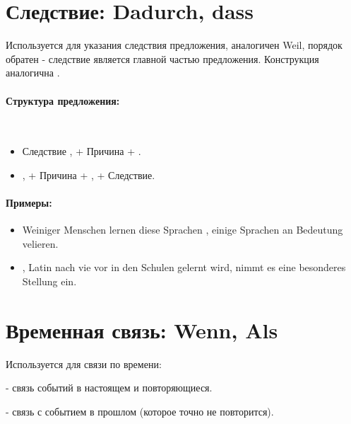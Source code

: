 \section{Следствие: Dadurch, dass}

Используется для указания следствия предложения, аналогичен Weil, порядок обратен - следствие является главной частью предложения. Конструкция аналогична .

\paragraph{Структура предложения:} ~\\
\begin{itemize}
    \item Следствие ,  + Причина + \dverb{}.
    \item {},  + Причина + \dverb{}, \dverb{} + Следствие.
\end{itemize}

\paragraph{Примеры:}
\begin{itemize}
\item Weiniger Menschen lernen diese Sprachen ,  einige Sprachen an Bedeutung velieren.
~\\ 
\item {},  Latin nach vie vor in den Schulen gelernt wird, nimmt es eine besonderes Stellung ein.
~\\ 
\end{itemize}

\section{Временная связь: Wenn, Als}

Используется для связи по времени:

 - связь событий в настоящем и повторяющиеся. 

 - связь с событием в прошлом (которое точно не повторится). 

